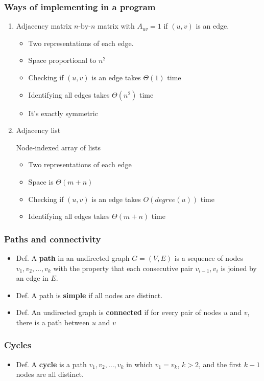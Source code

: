 \documentclass[11pt]{article}
\begin{document}
\subsubsection{Ways of implementing in a program}
\label{sec:orgd710aae}
\begin{enumerate}
\item Adjacency matrix
\label{sec:orgadeda72}
\(n\text{-by-}n\) matrix with \(A_{uv} = 1\) if \((u,v)\) is an edge.
\begin{itemize}
\item Two representations of each edge.
\item Space proportional to \(n^2\)
\item Checking if \((u,v)\) is an edge takes \(\Theta(1)\) time
\item Identifying all edges takes \(\Theta(n^2)\) time
\item It's exactly symmetric
\end{itemize}
\item Adjacency list
\label{sec:org56fce40}

Node-indexed array of lists
\begin{itemize}
\item Two representations of each edge
\item Space is \(\Theta(m+n)\)
\item Checking if \((u,v)\) is an edge takes \(O(degree(u))\) time
\item Identifying all edges takes \(\Theta(m+n)\) time
\end{itemize}
\end{enumerate}
\subsubsection{Paths and connectivity}
\label{sec:org4447bd0}
\begin{itemize}
\item Def. A \textbf{path} in an undirected graph \(G=(V,E)\) is a sequence of nodes \(v_1,v_2,\ldots,v_k\) with the property that each consecutive pair \(v_{i-1},v_i\) is joined by an edge in \(E\).
\item Def. A path is \textbf{simple} if all nodes are distinct.
\item Def. An undirected graph is \textbf{connected} if for every pair of nodes \(u\) and \(v\), there is a path between \(u\) and \(v\)
\end{itemize}
\subsubsection{Cycles}
\label{sec:org009ce86}
\begin{itemize}
\item Def. A \textbf{cycle} is a path \(v_1, v_2, \ldots, v_k\) in which \(v_1 = v_k\), \(k>2\), and the first \(k-1\) nodes are all distinct.
\end{itemize}
\end{document}
